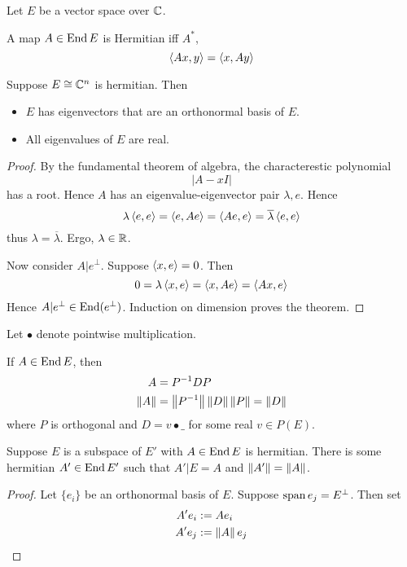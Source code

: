 \documentclass{scrartcl}
\newcommand{\conj}[1]{\overline{#1}}
\renewcommand{\define}{:=}
\begin{document}
  Let $E$ be a vector space over $\mathbb{C}$. 
\begin{defn}[Hermitian]
  A map $A\in \operatorname{End}{E}$ is Hermitian iff $A^*$, \ie
  \[
    \left\langle Ax, y \right\rangle=\left\langle x, Ay \right\rangle
  \]
\end{defn}
\begin{theorem}
  \label{finite-spectral-theorem}
  Suppose $E\cong \mathbb{C}^n$ is hermitian. Then
  \begin{itemize}
  \item $E$ has eigenvectors that are an orthonormal basis of $E$.
  \item All eigenvalues of $E$ are real. 
  \end{itemize}

\end{theorem}
\begin{proof}
  \renewcommand{\vec}{}
  By the fundamental theorem of algebra, the characterestic polynomial
  \[
    |A-xI|
  \]
  has a root. Hence $A$ has an eigenvalue-eigenvector pair $\lambda, \vec e$. Hence
  \[
    \lambda \inner{\vec e}{\vec e}=\inner{\vec e}{A \vec e}=\inner{A\vec e}{\vec e}=\conj\lambda \inner{\vec e}{\vec e}
  \]
  thus $\lambda = \conj\lambda$. Ergo, $\lambda\in \mathbb{R}$. 

  Now consider $A|e^\perp$. Suppose $\left\langle x, e \right\rangle=0$. Then 
  \[
    0=\lambda\left\langle x, e \right\rangle=\left\langle x, Ae \right\rangle=\left\langle Ax, e \right\rangle
  \]
  Hence $A|e^\perp\in\operatorname{End}(e^\perp)$. Induction on dimension proves the theorem. 
\end{proof}

Let $\bullet$ denote pointwise multiplication. 
\begin{cor}[diagonalization]
  \label{thm:diag}
  If $A\in\operatorname{End} E$, then 
  \begin{align*}
    A&=P^{-1}DP\\
    \left\|A \right\|&=\left\|P^{-1} \right\|\left\|D \right\| \left\|P \right\| =\left\|D \right\|
  \end{align*}
  where $P$ is orthogonal and $D = v\bullet\_$ for some real $v\in P(E)$. 
\end{cor}

\begin{lemma}
  \label{th:herm-ext}
  Suppose $E$  is a subspace of $E'$ with $A\in\operatorname{End} E$ is hermitian. There is some hermitian $A'\in\operatorname{End} E'$ such that $A'|E=A$ and $\left\|A' \right\|=\left\|A \right\|$.
\end{lemma}
\begin{proof}
  Let $\{e_i\}$ be an orthonormal basis of $E$. 
  Suppose $\operatorname*{span}{e_j}=E^\perp$. Then set
  \begin{align*}
    A'e_i&\define Ae_i \\
    A'e_j&\define\norm A e_j
  \end{align*}
\end{proof}
\end{document}
